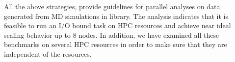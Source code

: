 All the above strategies, provide guidelines for parallel analyses on data generated from MD simulations in  library.
The analysis indicates that it is feasible to run an I/O bound task on HPC resources and achieve near ideal scaling behavior up to 8 nodes.
In addition, we have examined all these benchmarks on several HPC resources in order to make sure that they are independent of the resources.

